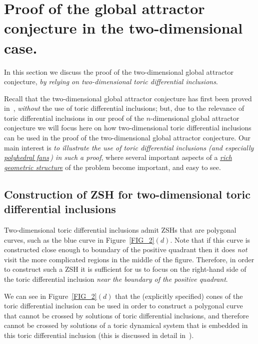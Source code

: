 \documentclass[12pt,letterpaper]{article}
\begin{document}
\section{Proof of the global attractor conjecture in the two-dimensional case.}



In this section we discuss the proof of the two-dimensional global attractor conjecture, {\em by relying on two-dimensional toric differential inclusions}. 

Recall that the two-dimensional global attractor conjecture has first been proved in~\cite{Anderson_Shiu_2010}, {\em without} the use of toric differential inclusions; but, due to the  relevance of toric differential inclusions in our proof of the $n$-dimensional global attractor conjecture 
we will focus here on how two-dimensional toric differential inclusions can be used in the proof of the two-dimensional global attractor conjecture. Our main interest  is {\em to illustrate the use of toric differential inclusions (and especially \underline{polyhedral fans}\,) in such a proof}, where several important aspects of a \ul{\em rich geometric structure} of the problem become important, and easy to see.  



\subsection{Construction of ZSH for two-dimensional toric differential inclusions}


Two-dimensional toric differential inclusions admit ZSHs that are polygonal curves, such as the blue curve in Figure~\ref{FIG_2}$(d)$. 
Note that if this curve is constructed close enough to boundary of the positive quadrant 
then it does {\em not} visit the more complicated regions in the middle of the figure.
Therefore, in order to construct such a ZSH it is sufficient for us to focus on the right-hand side of the toric differential inclusion {\em near the boundary of the positive quadrant}. 


We can see in Figure~\ref{FIG_2}$(d)$ that the (explicitly specified) cones of the toric differential inclusion can be used in order to construct a polygonal curve that cannot be crossed by solutions of toric differential inclusions, and therefore cannot be crossed by solutions of a toric dynamical system that is embedded in this toric differential inclusion (this is  discussed in detail in~\cite{Craciun_SIAGA_2019}).
\end{document}
